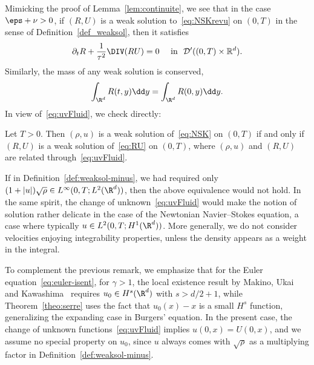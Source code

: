 Mimicking the proof of Lemma~\ref{lem:continuite}, we see that in the case $\eps + \nu >0$, if $(R,U)$ is a weak solution to~\eqref{eq:NSKrevu} on $(0,T)$ in the sense of Definition~\ref{def_weaksol}, then it satisfies
\[
\partial_t R +\frac{1}{\tau^2} \DIV(R U) = 0 \quad \text{ in \ $\mathcal D'((0,T) \times \mathbb R^d).$}
\]
Similarly, the mass of any weak solution is conserved,
\begin{equation*}
\int_{\R^d} R(t,y)\dd y = \int_{\R^d} R(0,y)\dd y.
\end{equation*}
In view of~\eqref{eq:uvFluid}, we check directly:

\begin{lemm}\label{lem:equivalence}
Let $T>0$. Then $(\rho,u)$ is a weak solution of~\eqref{eq:NSK} on $(0,T)$ if and only if $(R,U)$ is a weak solution of~\eqref{eq:RU} on $(0,T)$, where $(\rho,u)$ and $(R,U)$ are related through~\eqref{eq:uvFluid}.
\end{lemm}

\begin{rema}
If in Definition~\ref{def:weaksol-minus}, we had required only $(1+|u|)\sqrt\rho\in\linebreak L^\infty(0,T; L^2(\R^d))$, then the above equivalence would not hold. In the same spirit, the change of unknown~\eqref{eq:uvFluid} would make the notion of solution rather delicate in the case of the Newtonian Navier--Stokes equation, a case where typically $u\in L^2(0,T; H^1(\R^d))$. More generally, we do not consider velocities enjoying integrability properties, unless the density appears as a weight in the integral.
\end{rema}

\begin{rema}
To complement the previous remark, we emphasize that for the Euler equation~\eqref{eq:euler-isent}, for $\gamma>1$, the local existence result by Makino, Ukai and Kawashima~\cite{MUK86} requires $u_0\in H^s(\R^d)$ with $s>d/2+1$, while Theorem~\ref{theo:serre} uses the fact that $u_0(x)-x$ is a small $H^s$ function, generalizing the expanding case in Burgers' equation. In the present case, the change of unknown functions~\eqref{eq:uvFluid} implies $u(0,x)=U(0,x)$, and we assume no special property on $u_0$, since $u$ always comes with $\sqrt{\rho}$ as a multiplying factor in Definition~\ref{def:weaksol-minus}.
\end{rema}

